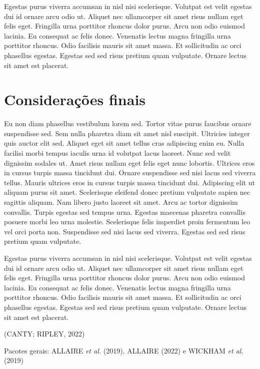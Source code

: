 \documentclass[
  a4paper,
]{report}
\begin{document}
Egestas purus viverra accumsan in nisl nisi scelerisque. Volutpat est
velit egestas dui id ornare arcu odio ut. Aliquet nec ullamcorper sit
amet risus nullam eget felis eget. Fringilla urna porttitor rhoncus
dolor purus. Arcu non odio euismod lacinia. Eu consequat ac felis donec.
Venenatis lectus magna fringilla urna porttitor rhoncus. Odio facilisis
mauris sit amet massa. Et sollicitudin ac orci phasellus egestas.
Egestas sed sed risus pretium quam vulputate. Ornare lectus sit amet est
placerat.

\hypertarget{considerauxe7uxf5es-finais}{%
\chapter{Considerações finais}\label{considerauxe7uxf5es-finais}}

Eu non diam phasellus vestibulum lorem sed. Tortor vitae purus faucibus
ornare suspendisse sed. Sem nulla pharetra diam sit amet nisl suscipit.
Ultricies integer quis auctor elit sed. Aliquet eget sit amet tellus
cras adipiscing enim eu. Nulla facilisi morbi tempus iaculis urna id
volutpat lacus laoreet. Nunc sed velit dignissim sodales ut. Amet risus
nullam eget felis eget nunc lobortis. Ultrices eros in cursus turpis
massa tincidunt dui. Ornare suspendisse sed nisi lacus sed viverra
tellus. Mauris ultrices eros in cursus turpis massa tincidunt dui.
Adipiscing elit ut aliquam purus sit amet. Scelerisque eleifend donec
pretium vulputate sapien nec sagittis aliquam. Nam libero justo laoreet
sit amet. Arcu ac tortor dignissim convallis. Turpis egestas sed tempus
urna. Egestas maecenas pharetra convallis posuere morbi leo urna
molestie. Scelerisque felis imperdiet proin fermentum leo vel orci porta
non. Suspendisse sed nisi lacus sed viverra. Egestas sed sed risus
pretium quam vulputate.

Egestas purus viverra accumsan in nisl nisi scelerisque. Volutpat est
velit egestas dui id ornare arcu odio ut. Aliquet nec ullamcorper sit
amet risus nullam eget felis eget. Fringilla urna porttitor rhoncus
dolor purus. Arcu non odio euismod lacinia. Eu consequat ac felis donec.
Venenatis lectus magna fringilla urna porttitor rhoncus. Odio facilisis
mauris sit amet massa. Et sollicitudin ac orci phasellus egestas.
Egestas sed sed risus pretium quam vulputate. Ornare lectus sit amet est
placerat.

(CANTY; RIPLEY, 2022)

Pacotes gerais: ALLAIRE \emph{et al.} (2019), ALLAIRE (2022) e WICKHAM
\emph{et al.} (2019)
\end{document}
